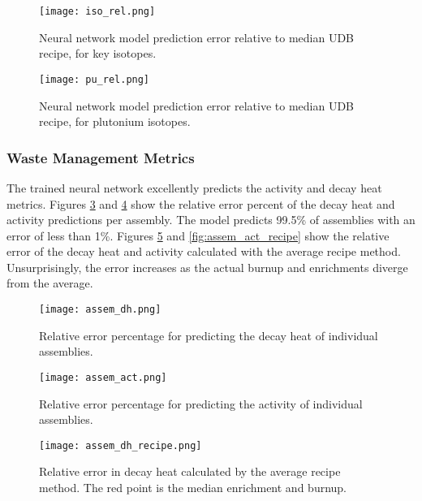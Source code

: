 \begin{figure}
    \centering
    \texttt{[image: iso\_rel.png]}
    \caption{Neural network model prediction error relative to median
             \gls{UDB} recipe, for key isotopes.}
    \label{fig:iso_rel}
\end{figure}


\begin{figure}
    \centering
    \texttt{[image: pu\_rel.png]}
    \caption{Neural network model prediction error relative to median
             \gls{UDB} recipe, for plutonium isotopes.}
    \label{fig:pu_rel}
\end{figure}

\FloatBarrier


\subsubsection{Waste Management Metrics}
The trained neural network excellently predicts the activity
and decay heat metrics. Figures \ref{fig:assem_dh} and \ref{fig:assem_act}
show the relative error percent of the decay heat and activity
predictions per assembly. The model predicts 99.5\% of
assemblies with an error of less than 1\%.
Figures \ref{fig:assem_dh_recipe} and
\ref{fig:assem_act_recipe} show the relative error
of the decay heat and activity calculated with the average
recipe method.
Unsurprisingly, the error increases as the actual burnup and enrichments
diverge from the average.

\begin{figure}
    \centering
    \texttt{[image: assem\_dh.png]}
    \caption{Relative error percentage for predicting the decay
             heat of individual assemblies.}
    \label{fig:assem_dh}
\end{figure}


\begin{figure}
    \centering
    \texttt{[image: assem\_act.png]}
    \caption{Relative error percentage for predicting the
             activity of individual assemblies.}
    \label{fig:assem_act}
\end{figure}



\begin{figure}
    \centering
    \texttt{[image: assem\_dh\_recipe.png]}
    \caption{Relative error in decay heat calculated by the average recipe
             method. The red point is the median enrichment and
             burnup.}
    \label{fig:assem_dh_recipe}
\end{figure}

